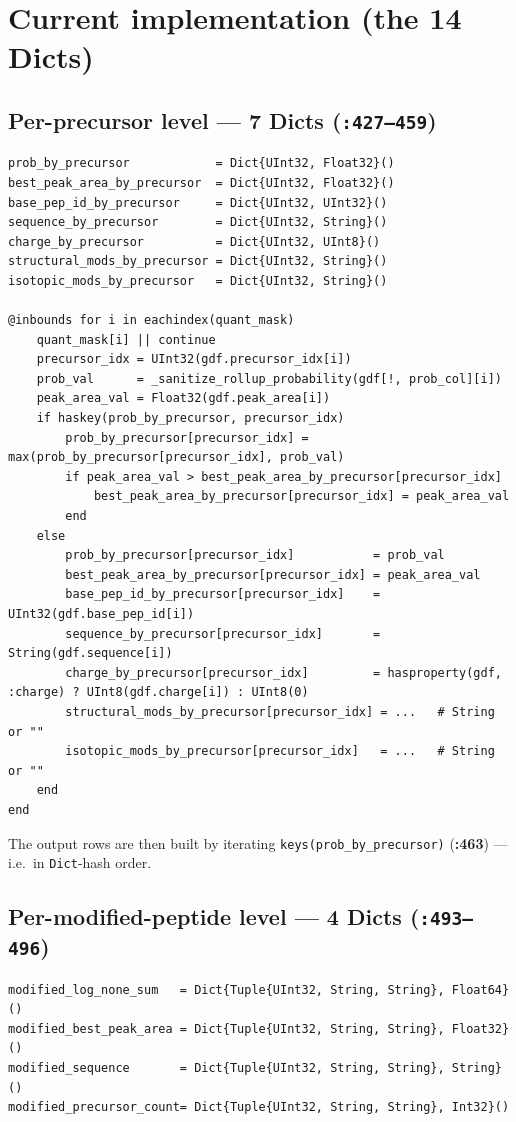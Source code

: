 \documentclass[11pt]{article}
\begin{document}
\section{Current implementation (the 14 Dicts)}
\subsection*{Per-precursor level --- 7 Dicts (\texttt{:427--459})}
\begin{lstlisting}[firstnumber=427]
prob_by_precursor            = Dict{UInt32, Float32}()
best_peak_area_by_precursor  = Dict{UInt32, Float32}()
base_pep_id_by_precursor     = Dict{UInt32, UInt32}()
sequence_by_precursor        = Dict{UInt32, String}()
charge_by_precursor          = Dict{UInt32, UInt8}()
structural_mods_by_precursor = Dict{UInt32, String}()
isotopic_mods_by_precursor   = Dict{UInt32, String}()

@inbounds for i in eachindex(quant_mask)
    quant_mask[i] || continue
    precursor_idx = UInt32(gdf.precursor_idx[i])
    prob_val      = _sanitize_rollup_probability(gdf[!, prob_col][i])
    peak_area_val = Float32(gdf.peak_area[i])
    if haskey(prob_by_precursor, precursor_idx)
        prob_by_precursor[precursor_idx] = max(prob_by_precursor[precursor_idx], prob_val)
        if peak_area_val > best_peak_area_by_precursor[precursor_idx]
            best_peak_area_by_precursor[precursor_idx] = peak_area_val
        end
    else
        prob_by_precursor[precursor_idx]           = prob_val
        best_peak_area_by_precursor[precursor_idx] = peak_area_val
        base_pep_id_by_precursor[precursor_idx]    = UInt32(gdf.base_pep_id[i])
        sequence_by_precursor[precursor_idx]       = String(gdf.sequence[i])
        charge_by_precursor[precursor_idx]         = hasproperty(gdf, :charge) ? UInt8(gdf.charge[i]) : UInt8(0)
        structural_mods_by_precursor[precursor_idx] = ...   # String or ""
        isotopic_mods_by_precursor[precursor_idx]   = ...   # String or ""
    end
end
\end{lstlisting}
The output rows are then built by iterating \texttt{keys(prob\_by\_precursor)}
(\textbf{:463}) --- i.e.\ in \texttt{Dict}-hash order.

\subsection*{Per-modified-peptide level --- 4 Dicts (\texttt{:493--496})}
\begin{lstlisting}[firstnumber=493]
modified_log_none_sum   = Dict{Tuple{UInt32, String, String}, Float64}()
modified_best_peak_area = Dict{Tuple{UInt32, String, String}, Float32}()
modified_sequence       = Dict{Tuple{UInt32, String, String}, String}()
modified_precursor_count= Dict{Tuple{UInt32, String, String}, Int32}()
\end{lstlisting}
\end{document}
